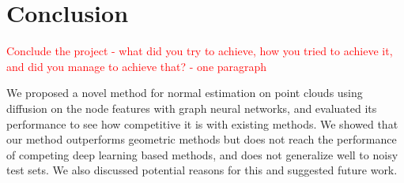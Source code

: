 \documentclass{acmart}
\begin{document}
\section{Conclusion}
\textcolor{red}{Conclude the project - what did you try to achieve, how you tried to achieve it, and did you manage to achieve that?  - one paragraph}

We proposed a novel method for normal estimation on point clouds using diffusion on the node features with graph neural networks, and evaluated its performance to see how competitive it is with existing methods. We showed that our method outperforms geometric methods but does not reach the performance of competing deep learning based methods, and does not generalize well to noisy test sets. We also discussed potential reasons for this and suggested future work.



\end{document}
